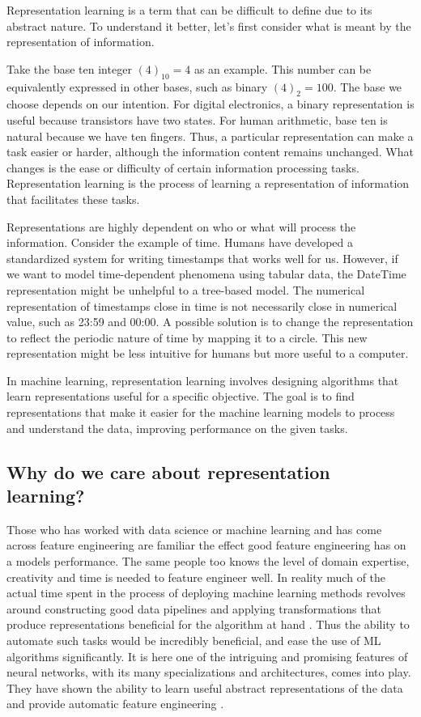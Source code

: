 \documentclass[../../thesis.tex]{subfiles}
\begin{document}
Representation learning is a term that can be difficult to define due to its abstract nature. To understand it better, let's first consider what is meant by the representation of information.\newline

Take the base ten integer $(4)_{10}= 4$ as an example. This number can be equivalently expressed in other bases, such as binary $(4)_{2}=100$. The base we choose depends on our intention. For digital electronics, a binary representation is useful because transistors have two states. For human arithmetic, base ten is natural because we have ten fingers. Thus, a particular representation can make a task easier or harder, although the information content remains unchanged. What changes is the ease or difficulty of certain information processing tasks. Representation learning is the process of learning a representation of information that facilitates these tasks.\newline

Representations are highly dependent on who or what will process the information. Consider the example of time. Humans have developed a standardized system for writing timestamps that works well for us. However, if we want to model time-dependent phenomena using tabular data, the DateTime representation might be unhelpful to a tree-based model. The numerical representation of timestamps close in time is not necessarily close in numerical value, such as 23:59 and 00:00. A possible solution is to change the representation to reflect the periodic nature of time by mapping it to a circle. This new representation might be less intuitive for humans but more useful to a computer.\newline

In machine learning, representation learning involves designing algorithms that learn representations useful for a specific objective. The goal is to find representations that make it easier for the machine learning models to process and understand the data, improving performance on the given tasks.

\subsection{Why do we care about representation learning?}
Those who has worked with data science or machine learning and has come across feature engineering are familiar the effect good feature engineering has on a models performance. The same people too knows the level of domain expertise, creativity and time is needed to feature engineer well. In reality much of the actual time spent in the process of deploying machine learning methods revolves around constructing good data pipelines and applying transformations that produce representations beneficial for the algorithm at hand \cite{Rep-rev-persp}. Thus the ability to automate such tasks would be incredibly beneficial, and ease the use of ML algorithms significantly. It is here one of the intriguing and promising features of neural networks, with its many specializations and architectures, comes into play. They have shown the ability to learn useful abstract representations of the data and provide automatic feature engineering \cite{Rep-rev-persp}. 
\end{document}
